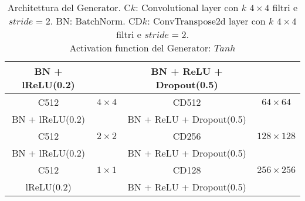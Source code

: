 \begin{table}[!h]
\begin{tabular}{|c|c||c|c|}
                BN + lReLU(0.2) &                & BN + ReLU + Dropout(0.5) & \\
                \hline
                \rule[-3mm]{0mm}{8mm}
                C512 & $4 \times 4$         & CD512 & $64 \times 64$ \\
                BN + lReLU(0.2) &                & BN + ReLU + Dropout(0.5) & \\
                \hline
                \rule[-3mm]{0mm}{8mm}
                C512 & $2 \times 2$         & CD256 & $128 \times 128$ \\
                BN + lReLU(0.2) &                & BN + ReLU + Dropout(0.5) & \\
                \hline
                \rule[-3mm]{0mm}{8mm}
                C512 & $1 \times 1$         & CD128 & $256 \times 256$ \\
                lReLU(0.2)      &                & BN + ReLU + Dropout(0.5) & \\
                \hline
            \end{tabular}
            \caption{Architettura del Generator. 
            C$k$: Convolutional layer con $k$ $4 \times 4$ filtri e $stride=2$. BN: BatchNorm. 
            CD$k$: ConvTranspose2d layer con $k$ $4 \times 4$ filtri e $stride=2$. \\
            Activation function del Generator: $Tanh$}
            \label{Generator Architecture}
        \end{table}

